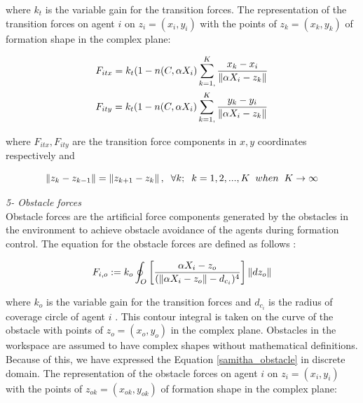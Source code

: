 where $k_t$ is the variable gain for the transition forces. The representation of the transition forces on agent $i$ on $z_i = (x_i, y_i)$ with the points of  $z_k = (x_k,y_k)$ of formation shape in the complex plane:
			
\begin{align}
\begin{split}
&F_{itx} = k_t  (1-n(C,\alpha X_i) \sum_{k=1,}^{K}\frac{x_k- x_i}{\left\lVert\alpha X_i - z_k\right\rVert}\\
&F_{ity} = k_t  (1-n(C,\alpha X_i) \sum_{k=1,}^{K}\frac{y_k- y_i}{\left\lVert\alpha X_i - z_k\right\rVert}\\
\end{split}
\end{align}
			
where  $F_{itx} , F_{ity} $ are the transition force components in $x,y$ coordinates respectively and

\begin{equation}
\left\lVert z_k - z_{k-1}\right\rVert = \left\lVert z_{k+1} - z_k\right\rVert, \hspace{0.2cm}  \forall k ;  \hspace{0.2cm} k=1,2,...,K \hspace{0.2cm} when  \hspace{0.2cm} K \to\infty
\end{equation}					
			
\textit{			5- Obstacle forces} \\ 
Obstacle forces are the artificial force components generated by the obstacles in the environment to achieve obstacle avoidance of the agents during formation control. 	
The equation for the obstacle forces are defined as follows \cite{17}:	
			
\begin{equation} \label{samitha_obstacle}
F_{i,o} := k_o  \oint_O \left[\frac{\alpha X_i - z_o}{(\left\lVert\alpha X_i - z_o\right\rVert - d_{c_i})^4}\right] \left\lVert dz_o\right\rVert
\end{equation}
			
where $k_o$ is the variable gain for the transition forces and $d_{c_i}$ is the radius of coverage circle of agent $i$ . This contour integral is taken on the curve of the obstacle with  points of $z_o = (x_o,y_o)$ in the complex plane. Obstacles in the workspace are assumed to have complex shapes without mathematical definitions. Because of this, we have expressed the Equation \ref{samitha_obstacle} in discrete domain. The representation of the obstacle forces on agent $i$ on $z_i = (x_i, y_i)$ with the points of  $z_{ok} = (x_{ok},y_{ok})$ of formation shape in the complex plane:
			
